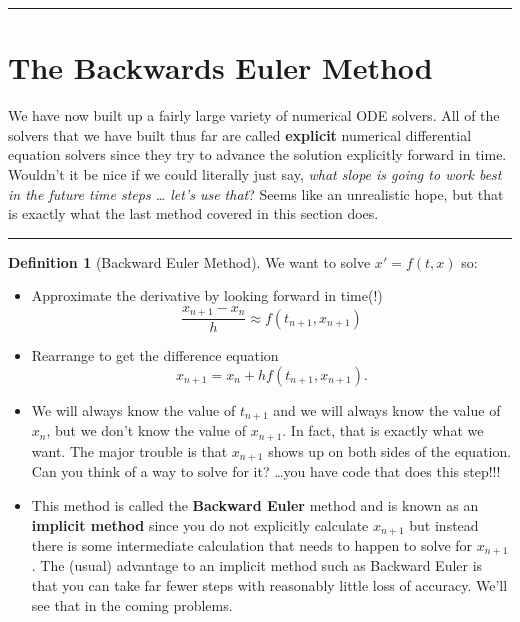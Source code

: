 \documentclass[
]{book}
\providecommand{\tightlist}{%
  \setlength{\itemsep}{0pt}\setlength{\parskip}{0pt}}
\theoremstyle{definition}
\newtheorem{definition}{Definition}[chapter]
\theoremstyle{definition}
\theoremstyle{definition}
\theoremstyle{remark}
\begin{document}
\begin{center}\rule{0.5\linewidth}{0.5pt}\end{center}

\hypertarget{the-backwards-euler-method}{%
\section{The Backwards Euler Method}\label{the-backwards-euler-method}}

We have now built up a fairly large variety of numerical ODE solvers. All of the solvers that we have built thus far are called \textbf{explicit} numerical differential equation solvers since they try to advance the solution explicitly forward in time. Wouldn't it be nice if we could literally just say, \emph{what slope is going to work best in the future time steps \ldots{} let's use that}? Seems like an unrealistic hope, but that is exactly what the last method covered in this section does.

\begin{center}\rule{0.5\linewidth}{0.5pt}\end{center}

\begin{definition}[Backward Euler Method]
\protect\hypertarget{def:unnamed-chunk-469}{}{\label{def:unnamed-chunk-469} {} }We want to solve \(x' = f(t,x)\) so:

\begin{itemize}
\tightlist
\item
  Approximate the derivative by looking forward in time(!)
  \[\frac{x_{n+1} - x_n}{h} \approx f(t_{n+1}, x_{n+1})\]
\item
  Rearrange to get the difference equation
  \[x_{n+1} = x_n + h f(t_{n+1},x_{n+1}).\]
\item
  We will always know the value of \(t_{n+1}\) and we will always know the value of \(x_n\), but we don't know the value of \(x_{n+1}\). In fact, that is exactly what we want. The major trouble is that \(x_{n+1}\) shows up on both sides of the equation. Can you think of a way to solve for it? \ldots you have code that does this step!!!
\item
  This method is called the \textbf{Backward Euler} method and is known as an \textbf{implicit method} since you do not explicitly calculate \(x_{n+1}\) but instead there is some intermediate calculation that needs to happen to solve for \(x_{n+1}\). The (usual) advantage to an implicit method such as Backward Euler is that you can take far fewer steps with reasonably little loss of accuracy. We'll see that in the coming problems.
\end{itemize}
\end{definition}
\end{document}
